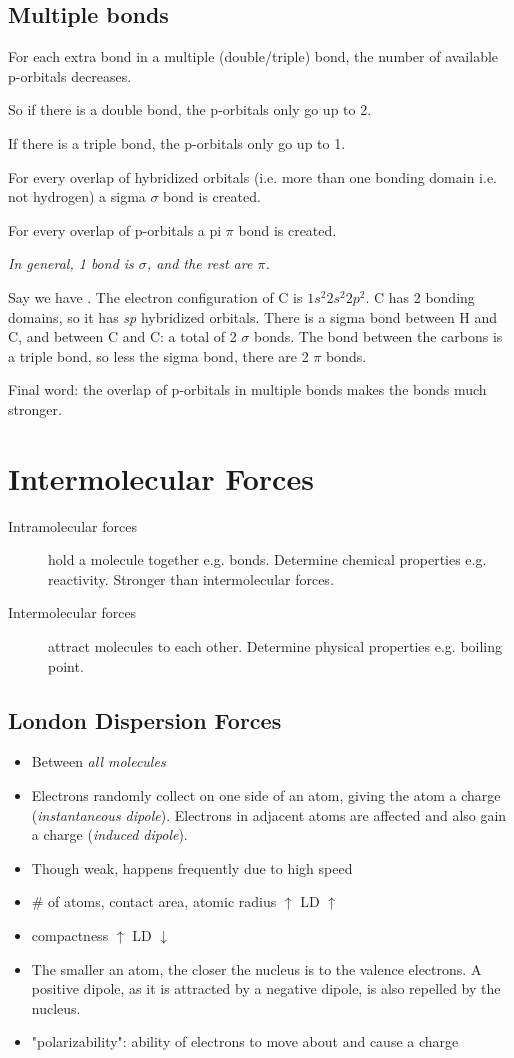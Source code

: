 \documentclass[a4paper, 8pt]{memoir}
\begin{document}
\section{Multiple bonds}
For each extra bond in a multiple (double/triple) bond, the number of available p-orbitals decreases.

So if there is a double bond, the p-orbitals only go up to 2.

If there is a triple bond, the p-orbitals only go up to 1.

For every overlap of hybridized orbitals (i.e. more than one bonding domain i.e. not hydrogen) a sigma $\sigma$ bond is created. 

For every overlap of p-orbitals a pi $\pi$ bond is created. 

\emph{In general, 1 bond is $\sigma$, and the rest are $\pi$.}

Say we have . The electron configuration of C is $1s^2 2s^2 2p^2$. C has 2 bonding domains, so it has \emph{sp} hybridized orbitals. There is a sigma bond between H and C, and between C and C: a total of 2 $\sigma$ bonds. The bond between the carbons is a triple bond, so less the sigma bond, there are 2 $\pi$ bonds.

Final word: the overlap of p-orbitals in multiple bonds makes the bonds much stronger.

\chapter{Intermolecular Forces}
\begin{description}
\item[Intramolecular forces] hold a molecule together e.g. bonds. Determine chemical properties e.g. reactivity. Stronger than intermolecular forces.
\item[Intermolecular forces] attract molecules to each other. Determine physical properties e.g. boiling point.
\end{description}
\section{London Dispersion Forces}
\begin{itemize}
	\item Between \emph{all molecules}
	\item Electrons randomly collect on one side of an atom, giving the atom a charge (\emph{instantaneous dipole}). Electrons in adjacent atoms are affected and also gain a charge (\emph{induced dipole}). 
	\item Though weak, happens frequently due to high speed
	\item \# of atoms, contact area, atomic radius $\uparrow$ LD $\uparrow$
	\item compactness $\uparrow$ LD $\downarrow$
	\item The smaller an atom, the closer the nucleus is to the valence electrons. A positive dipole, as it is attracted by a negative dipole, is also repelled by the nucleus.
	\item "polarizability": ability of electrons to move about and cause a charge
\end{itemize}	
\end{document}
